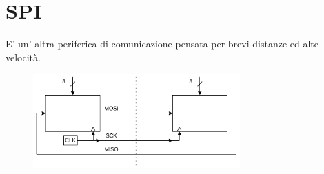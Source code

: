 \section{SPI}
E' un' altra periferica di comunicazione pensata per brevi distanze ed alte velocità.

\begin{figure}[H]
    \centering
    \includegraphics[width=300px]{images/23_SPI/SPI.png}
\end{figure}

